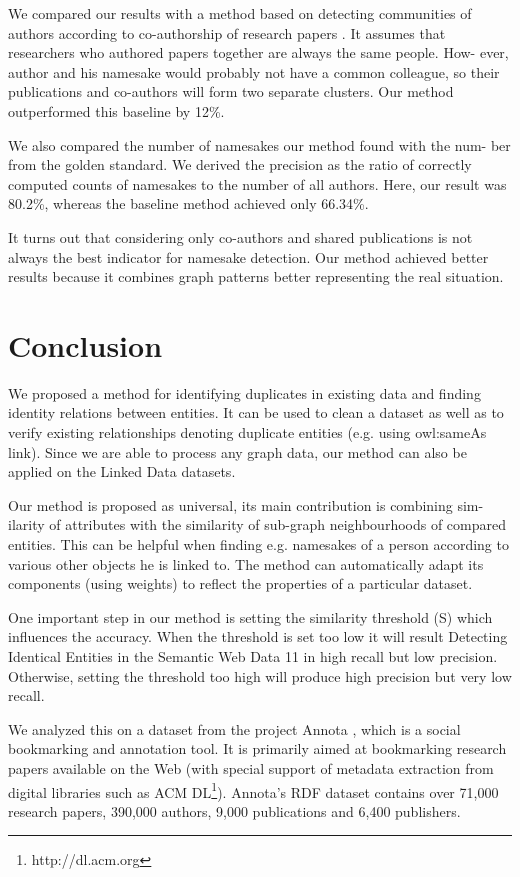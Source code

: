 \documentclass{llncs}
\begin{document}
We compared our results with a method based on detecting communities
of authors according to co-authorship of research papers \cite{zaiane2009mining}. It assumes that
researchers who authored papers together are always the same people. How-
ever, author and his namesake would probably not have a common colleague, so
their publications and co-authors will form two separate clusters. Our method
outperformed this baseline by 12\%.

We also compared the number of namesakes our method found with the num-
ber from the golden standard. We derived the precision as the ratio of correctly
computed counts of namesakes to the number of all authors. Here, our result
was 80.2\%, whereas the baseline method achieved only 66.34\%.

It turns out that considering only co-authors and shared publications is not
always the best indicator for namesake detection. Our method achieved better
results because it combines graph patterns better representing the real situation.

\section {Conclusion}

We proposed a method for identifying duplicates in existing data and finding
identity relations between entities. It can be used to clean a dataset as well as to
verify existing relationships denoting duplicate entities (e.g. using owl:sameAs
link). Since we are able to process any graph data, our method can also be
applied on the Linked Data datasets.

Our method is proposed as universal, its main contribution is combining sim-
ilarity of attributes with the similarity of sub-graph neighbourhoods of compared
entities. This can be helpful when finding e.g. namesakes of a person according
to various other objects he is linked to. The method can automatically adapt its
components (using weights) to reflect the properties of a particular dataset.

One important step in our method is setting the similarity threshold (S)
which influences the accuracy. When the threshold is set too low it will result
Detecting Identical Entities in the Semantic Web Data 11
in high recall but low precision. Otherwise, setting the threshold too high will
produce high precision but very low recall.

We analyzed this on a dataset from the project Annota \cite{holub2014annota}, which is a social
bookmarking and annotation tool. It is primarily aimed at bookmarking research
papers available on the Web (with special support of metadata extraction from
digital libraries such as ACM DL\footnote{http://dl.acm.org}). Annota's RDF dataset contains over 71,000
research papers, 390,000 authors, 9,000 publications and 6,400 publishers.
\end{document}
